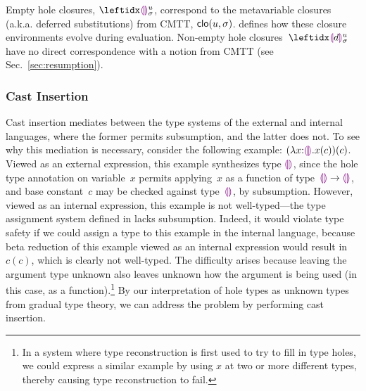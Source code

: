 Empty hole closures, $\dehole{u}{\sigma}{}$,  correspond to the metavariable closures (a.k.a. deferred substitutions) from CMTT, $\mathsf{clo}(u, \sigma)$.
%
 defines how these closure environments evolve during evaluation.
%
Non-empty hole closures~$\dhole{d}{u}{\sigma}{}$ have no direct correspondence with a notion from CMTT (see Sec.~\ref{sec:resumption}).

\subsubsection{Cast Insertion}\label{sec:cast-insertion}
%
%
Cast insertion mediates between the type systems of the external and
internal languages, where the former permits subsumption, and the
latter does not.
%
To see why this mediation is necessary, consider the following
example: $(\lambda x{:}\textcolor{violet}{\llparenthesis}\textcolor{violet}{\rrparenthesis}.x(c))(c)$.
%
Viewed as an external expression, this example synthesizes type
$\textcolor{violet}{\llparenthesis}\textcolor{violet}{\rrparenthesis}$, since the hole type annotation on variable~$x$ permits
applying~$x$ as a function of type~$\textcolor{violet}{\llparenthesis}\textcolor{violet}{\rrparenthesis} \rightarrow \textcolor{violet}{\llparenthesis}\textcolor{violet}{\rrparenthesis}$, and base
constant~$c$ may be checked against type~$\textcolor{violet}{\llparenthesis}\textcolor{violet}{\rrparenthesis}$, by subsumption.
%
However, viewed as an internal expression, this example is not
well-typed---the type assignment system defined in
 lacks subsumption.
%
Indeed, it would violate type safety if we could assign a type to this
example in the internal language, because beta reduction of this
example viewed as an internal expression would result in $c(c)$, which
is clearly not well-typed.
%
The difficulty arises because leaving the argument type unknown also leaves unknown how
the argument is being used (in this case, as a function).\footnote{In a system where type reconstruction is first used
to try to fill in type holes, we could express a similar example by
using $x$ at two or more different types, thereby causing type
reconstruction to fail.
%
}
By our interpretation of hole types as unknown types from gradual type
theory, we can address the problem by performing cast insertion.
%

